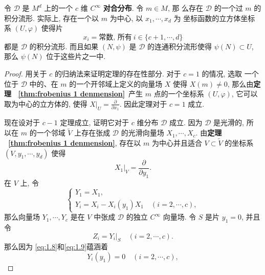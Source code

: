 \begin{thm}[Frobenius定理]\label{thm: Frobenius}
    令 $\mathscr{D}$ 是 $M^d$ 上的一个 $c$ 维 $C^{\infty}$ \textbf{对合分布}. 令 $m \in M$, 那 么存在 $\mathscr{D}$ 的一个过 $m$ 的积分流形. 实际上, 存在一个以 $m$ 为中心, 以 $x_1, \cdots, x_d$ 为 坐标函数的立方体坐标系 $(U, \varphi)$ 使得片
    \begin{equation}
        \label{eq:1.7}
        x_i= \text{常数, 所有} ~i \in\{c+1, \cdots, d\}
    \end{equation}
都是 $\mathscr{D}$ 的积分流形. 而且如果 $(N, \psi)$ 是 $\mathscr{D}$ 的连通积分流形使得 $\psi(N) \subset U$, 那么 $\psi(N)$ 位于这些片之一中.
\end{thm}
\begin{proof}
用关于 $c$ 的归纳法来证明定理的存在性部分. 对于 $c=1$ 的情况, 选取 一个位于 $\mathscr{D}$ 中的、在 $m$ 的一个开邻域上定义的向量场 $X$ 使得 $X(m) \neq 0$, 那么由\textbf{定理 ~\ref{thm:frobenius 1 denmension}}~产生 $m$ 点的一个坐标系 $(U, \varphi)$, 它可以取为中心的立方体的, 使得 $\left.X\right|_U=\frac{\partial}{\partial x_1}$. 因此定理对于 $c=1$ 成立.

现在设对于 $c-1$ 定理成立, 证明它对于 $c$ 维分布 $\mathscr{D}$ 成立. 因为 $\mathscr{D}$ 是光滑的, 所 以在 $m$ 的一个邻域 $\tilde{V}$ 上存在张成 $\mathscr{D}$ 的光滑向量场 $X_1, \cdots, X_c$. 由\textbf{定理 ~\ref{thm:frobenius 1 denmension}}, 存在以 $m$ 为中心并且适合 $V \subset \tilde{V}$ 的坐标系 $\left(V, y_1, \cdots, y_d\right)$ 使得
\begin{equation}
    \label{eq:1.8}
    \left.X_1\right|_V=\frac{\partial}{\partial y_1} .
\end{equation}
在 $V$ 上, 令
\begin{equation}
    \label{eq:1.9}
    \left\{\begin{array}{l}
Y_1=X_1, \\
Y_i=X_i-X_i\left(y_1\right) X_1 \quad(i=2, \cdots, c),
\end{array}\right.
\end{equation}
那么向量场 $Y_1, \cdots, Y_c$ 是在 $V$ 中张成 $\mathscr{D}$ 的独立 $C^{\infty}$ 向量场. 令 $S$ 是片 $y_1=0$, 并且令
\begin{equation}\label{eq:1.10}
    Z_i=Y_i |_S\quad (i=2,\cdots,c).
\end{equation}
那么因为 \eqref{eq:1.8}和\eqref{eq:1.9}蕴涵着
\begin{equation}
    \label{eq:1.11}
    Y_i\left(y_1\right)=0 \quad(i=2, \cdots, c),
\end{equation}


\end{proof}
